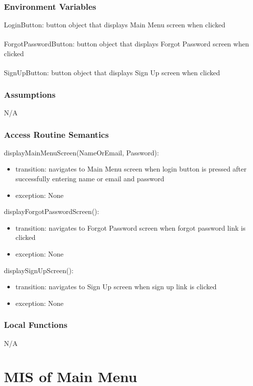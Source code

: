 \documentclass[12pt, titlepage]{article}
\begin{document}
\subsubsection{Environment Variables}
LoginButton: button object that displays Main Menu screen when clicked\\\\
ForgotPasswordButton: button object that displays Forgot Password screen when clicked\\\\
SignUpButton: button object that displays Sign Up screen when clicked

\subsubsection{Assumptions}

N/A

\subsubsection{Access Routine Semantics}

\noindent displayMainMenuScreen(NameOrEmail, Password):
\begin{itemize}
	\item transition: navigates to Main Menu screen when login button is pressed after successfully entering name or email and password 
	\item exception: None 
\end{itemize}

\noindent displayForgotPasswordScreen():
\begin{itemize}
	\item transition: navigates to Forgot Password screen when forgot password link is clicked 
	\item exception: None 
\end{itemize}

\noindent displaySignUpScreen():
\begin{itemize}
	\item transition: navigates to Sign Up screen when sign up link is clicked 
	\item exception: None 
\end{itemize}

\subsubsection{Local Functions}
N/A

\section{MIS of Main Menu} \label{Module} 
\end{document}
